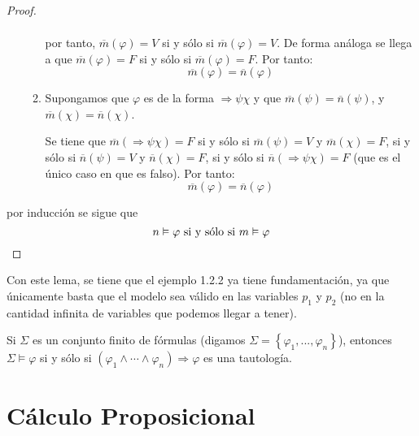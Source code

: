 \documentclass[12pt]{report}
\theoremstyle{largebreak}
\begin{document}
\begin{proof}
\begin{itemize}
\begin{enumerate}
\begin{equation*}
\begin{split}
                    \end{split}
                \end{equation*}
                por tanto, $\overline{m}(\varphi)=V$ si y sólo si $\overline{m}(\varphi)=V$. De forma análoga se llega a que $\overline{m}(\varphi)=F$ si y sólo si $\overline{m}(\varphi)=F$. Por tanto:
                \begin{equation*}
                    \overline{m}(\varphi)=\overline{n}(\varphi)
                \end{equation*}
                \item Supongamos que $\varphi$ es de la forma $\Rightarrow\psi\chi$ y que $\overline{m}(\psi)=\overline{n}(\psi)$, y $\overline{m}(\chi)=\overline{n}(\chi)$.
                
                Se tiene que $\overline{m}(\Rightarrow\psi\chi)=F$ si y sólo si $\overline{m}(\psi)=V$ y $\overline{m}(\chi)=F$, si y sólo si $\overline{n}(\psi)=V$ y $\overline{n}(\chi)=F$, si y sólo si $\overline{n}(\Rightarrow\psi\chi)=F$ (que es el único caso en que es falso). Por tanto:
                \begin{equation*}
                    \overline{m}(\varphi)=\overline{n}(\varphi)
                \end{equation*}
            \end{enumerate}
        \end{itemize}
        por inducción se sigue que
        \begin{equation*}
            n\vDash\varphi\textup{ si y sólo si } m\vDash\varphi
        \end{equation*}
    \end{proof}

    Con este lema, se tiene que el ejemplo 1.2.2 ya tiene fundamentación, ya que únicamente basta que el modelo sea válido en las variables $p_1$ y $p_2$ (no en la cantidad infinita de variables que podemos llegar a tener).

    \begin{obs}
        Si $\Sigma$ es un conjunto finito de fórmulas (digamos $\Sigma=\left\{\varphi_1,...,\varphi_n \right\}$), entonces $\Sigma\vDash\varphi$ si y sólo si $(\varphi_1\land\cdots\land\varphi_n)\Rightarrow\varphi$ es una tautología.
    \end{obs}

    \section{Cálculo Proposicional}
\end{document}

